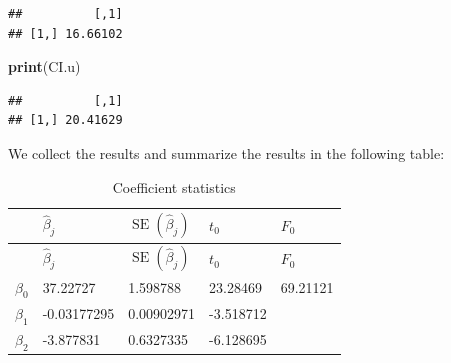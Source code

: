 \documentclass[
]{article}
\newenvironment{Shaded}{\begin{snugshade}}{\end{snugshade}}
\newcommand{\FunctionTok}[1]{\textcolor[rgb]{0.13,0.29,0.53}{\textbf{#1}}}
\newcommand{\NormalTok}[1]{#1}
\begin{document}
\begin{verbatim}
##          [,1]
## [1,] 16.66102
\end{verbatim}

\begin{Shaded}
\begin{Highlighting}[]
\FunctionTok{print}\NormalTok{(CI.u)}
\end{Highlighting}
\end{Shaded}

\begin{verbatim}
##          [,1]
## [1,] 20.41629
\end{verbatim}

We collect the results and summarize the results in the following table:

\begin{longtable}[]{@{}lllll@{}}
\caption{Coefficient statistics}\tabularnewline
\toprule\noalign{}
& \(\hat\beta_j\) & \(\operatorname{SE}(\hat\beta_j)\) & \(t_0\) &
\(F_0\) \\
\midrule\noalign{}
\endfirsthead
\toprule\noalign{}
& \(\hat\beta_j\) & \(\operatorname{SE}(\hat\beta_j)\) & \(t_0\) &
\(F_0\) \\
\midrule\noalign{}
\endhead
\bottomrule\noalign{}
\endlastfoot
\(\beta_0\) & 37.22727 & 1.598788 & 23.28469 & 69.21121 \\
\(\beta_1\) & -0.03177295 & 0.00902971 & -3.518712 & \\
\(\beta_2\) & -3.877831 & 0.6327335 & -6.128695 & \\
\end{longtable}
\end{document}
